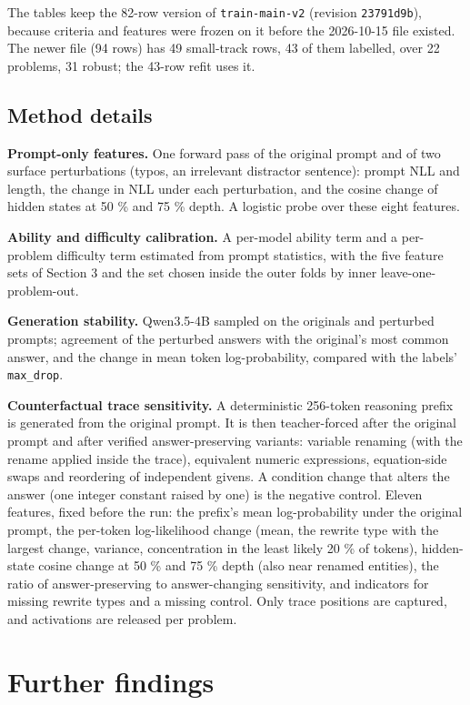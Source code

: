 \documentclass{article}
\begin{document}
The tables keep the 82-row version of \texttt{train-main-v2} (revision \texttt{23791d9b}), because criteria
and features were frozen on it before the 2026-10-15 file existed. The newer file (94 rows) has 49
small-track rows, 43 of them labelled, over 22 problems, 31 robust; the 43-row refit uses it.

\subsection{Method details}\label{sec:B4}

\textbf{Prompt-only features.} One forward pass of the original prompt and of two surface
perturbations (typos, an irrelevant distractor sentence): prompt NLL and length, the change in NLL
under each perturbation, and the cosine change of hidden states at 50 \% and 75 \% depth. A
logistic probe over these eight features.

\textbf{Ability and difficulty calibration.} A per-model ability term and a per-problem difficulty term
estimated from prompt statistics, with the five feature sets of Section 3 and the set chosen inside the outer folds by inner leave-one-problem-out.

\textbf{Generation stability.} Qwen3.5-4B sampled on the originals and perturbed prompts; agreement of the perturbed answers with the original's most common answer, and the change in mean token log-probability, compared with the labels' \texttt{max\_drop}.

\textbf{Counterfactual trace sensitivity.} A deterministic 256-token reasoning prefix is generated from
the original prompt. It is then teacher-forced after the original prompt and after verified
answer-preserving variants: variable renaming (with the rename applied inside the trace),
equivalent numeric expressions, equation-side swaps and reordering of independent givens. A
condition change that alters the answer (one integer constant raised by one) is the negative
control. Eleven features, fixed before the run: the prefix's mean log-probability under the original prompt, the
per-token log-likelihood change (mean, the rewrite type with the largest change,
variance, concentration in the least likely 20 \% of tokens), hidden-state cosine change at 50 \%
and 75 \% depth (also near renamed entities), the ratio of answer-preserving to answer-changing
sensitivity, and indicators for missing rewrite types and a missing control. Only trace positions are
captured, and activations are released per problem.

\section{Further findings}
\end{document}
